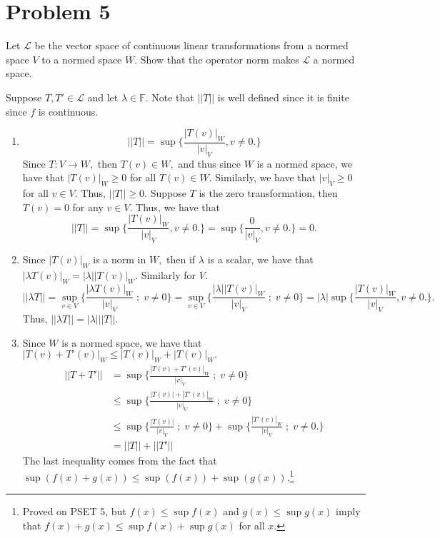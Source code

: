 \documentclass[11pt]{article}
\begin{document}
\section*{Problem 5}
\begin{problem}
Let $\mathcal{L}$ be the vector space of continuous linear transformations from a normed space $V$ to a normed space $W.$ Show that the operator norm makes $\mathcal{L}$ a normed space.    
\end{problem}
\begin{solution}
    Suppose $T, T' \in \mathcal{L}$ and let $\lambda \in \mathbb{F}.$ Note that $||T||$ is well defined since it is finite since $f$ is continuous.
    \begin{enumerate}
        \item 
        \[||T|| = \sup\{\frac{|T(v)|_W}{|v|_V}, v \neq 0.\}\] Since $T: V\to W,$ then $T(v)\in W,$ and thus since $W$ is a normed space, we have that $|T(v)|_W\geq 0$ for all $T(v)\in W.$ Similarly, we have that $|v|_V\geq 0$ for all $v \in V.$ Thus, $||T||\geq 0.$ Suppose $T$ is the zero transformation, then $T(v) = 0$ for any $v\in V.$ Thus, we have that 
        \[||T|| = \sup\{\frac{|T(v)|_W}{|v|_V}, v \neq 0.\} = \sup\{\frac{0}{|v|_V}, v \neq 0.\} = 0.\]
        \item Since $|T(v)|_W$ is a norm in $W,$ then if $\lambda$ is a scalar, we have that $|\lambda T(v)|_W = |\lambda||T(v)|_W.$ Similarly for $V.$
        \[||\lambda T|| = \sup_{v\in V}\{\frac{|\lambda T(v)|_W}{|v|_V}\; ; \; v \neq 0\} = \sup_{v\in V}\{\frac{|\lambda| |T(v)|_W}{|v|_V}\; ; \; v \neq 0\} = |\lambda|\sup\{\frac{|T(v)|_W}{|v|_V}, v \neq 0.\}.\] Thus, $||\lambda T|| = |\lambda|||T||.$
        \item Since $W$ is a normed space, we have that $|T(v) + T'(v)|_W \leq |T(v)|_W + |T(v)|_W.$
        \begin{align*}
          ||T + T'|| &= \sup\{\frac{|T(v) + T'(v)|_W}{|v|_V}\; ;\; v \neq 0\}\\
          &\leq \sup\{\frac{|T(v)| + |T'(v)|_W}{|v|_V}\; ;\; v \neq 0\}\\
          &\leq \sup\{\frac{|T(v)|}{|v|_V}\; ;\; v \neq 0\} + \sup\{\frac{|T'(v)|_W}{|v|_V}\; ;\; v \neq 0.\}\\
          &= ||T|| + ||T'||
        \end{align*}
        The last inequality comes from the fact that $\sup(f(x) +g(x))\leq \sup(f(x)) + \sup(g(x)).$\footnote{Proved on PSET 5, but $f(x)\leq \sup f(x)$ and $g(x)\leq \sup g(x)$ imply that $f(x) + g(x)\leq \sup f(x) + \sup g(x)$ for all $x.$}
    \end{enumerate}
\end{solution}
\end{document}
